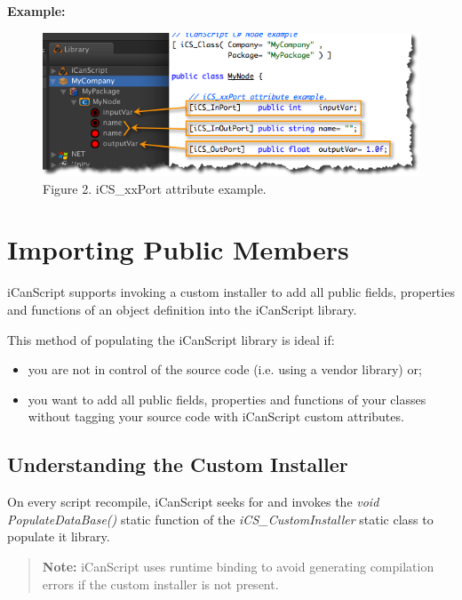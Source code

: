 \textbf{Example:}

\begin{figure}[htbp]
\centering
\includegraphics[keepaspectratio,width=\textwidth,height=0.75\textheight]{attribute-iCS_xxPort-example.png}
\caption{Figure 2. iCS\_xxPort attribute example.}
\label{attribute-ics_xxport-example.png}
\end{figure}

\chapter{Importing Public Members}
\label{importingpublicmembers}

iCanScript supports invoking a custom installer to add all public fields, properties and functions of an object definition into the iCanScript library.

This method of populating the iCanScript library is ideal if:

\begin{itemize}
\item you are not in control of the source code (i.e. using a vendor library) or;

\item you want to add all public fields, properties and functions of your classes without tagging your source code with iCanScript custom attributes.

\end{itemize}

\section{Understanding the Custom Installer}
\label{understandingthecustominstaller}

On every script recompile, iCanScript seeks for and invokes the \emph{void PopulateDataBase()} static function of the \emph{iCS\_CustomInstaller} static class to populate it library.

\begin{quote}

\textbf{Note:} iCanScript uses runtime binding to avoid generating compilation errors if the custom installer is not present.
\end{quote}

